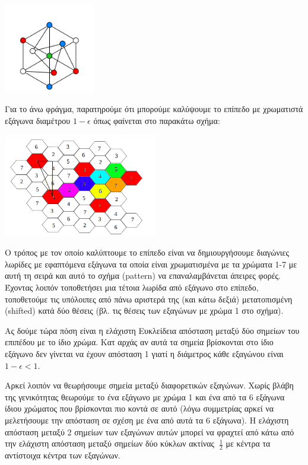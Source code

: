 \documentclass[a4paper, oneside, 11pt]{article}
\theoremstyle{definition}
\begin{document}
\begin{enumerate}
   \begin{center}
      \includegraphics[width=0.3\textwidth]{./pics/golomb.png}
   \end{center}

   Για το άνω φράγμα, παρατηρούμε ότι μπορούμε καλύψουμε το επίπεδο
   με χρωματιστά εξάγωνα διαμέτρου $1 - \epsilon$ όπως φαίνεται
   στο παρακάτω σχήμα:

   \begin{center}
      \includegraphics[width=0.5\textwidth]{./pics/grid.png}
   \end{center}

   Ο τρόπος με τον οποίο καλύπτουμε το επίπεδο είναι
   να δημιουργήσουμε διαγώνιες λωρίδες με εφαπτόμενα εξάγωνα τα οποία
   είναι χρωματισμένα με τα χρώματα 1-7 με αυτή τη σειρά και αυτό το
   σχήμα (pattern) να επαναλαμβάνεται άπειρες φορές. Έχοντας λοιπόν
   τοποθετήσει μια τέτοια λωρίδα από εξάγωνο στο επίπεδο, τοποθετούμε
   τις υπόλοιπες από πάνω αριστερά της (και κάτω δεξιά) μετατοπισμένη
   (shifted) κατά δύο θέσεις (βλ. τις θέσεις των εξαγώνων με χρώμα
   1 στο σχήμα).
   
   Ας δούμε τώρα πόση είναι η ελάχιστη Ευκλείδεια απόσταση μεταξύ δύο
   σημείων του επιπέδου με το ίδιο χρώμα. Κατ αρχάς αν αυτά τα σημεία
   βρίσκονται στο ίδιο εξάγωνο δεν γίνεται να έχουν απόσταση 1 γιατί
   η διάμετρος κάθε εξαγώνου είναι $1 - \epsilon < 1$.
   
   Αρκεί λοιπόν να θεωρήσουμε σημεία μεταξύ διαφορετικών εξαγώνων.
   Χωρίς βλάβη της γενικότητας
   θεωρούμε το ένα εξάγωνο με χρώμα 1 και ένα από τα 6 εξάγωνα
   ίδιου χρώματος που βρίσκονται
   πιο κοντά σε αυτό (λόγω συμμετρίας αρκεί να μελετήσουμε την απόσταση
   σε σχέση με ένα από αυτά τα 6 εξάγωνα). Η ελάχιστη απόσταση μεταξύ 2
   σημείων των εξαγώνων αυτών μπορεί να φραχτεί από κάτω από την
   ελάχιστη απόσταση μεταξύ σημείων δύο κύκλων ακτίνας $~\frac{1}{2}$
   με κέντρα τα αντίστοιχα κέντρα των εξαγώνων.


\end{enumerate}
\end{document}
